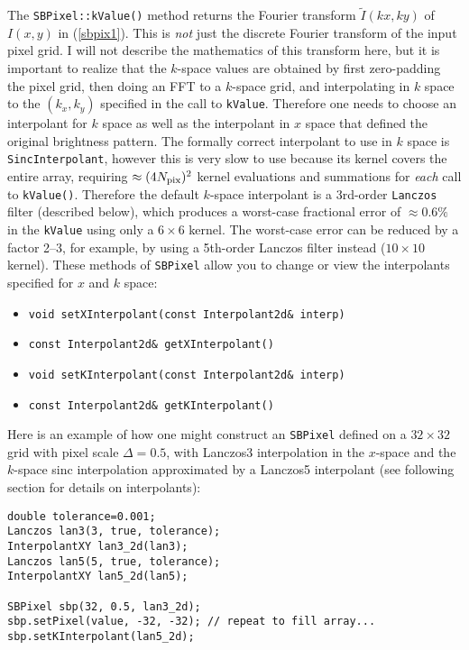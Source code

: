 \documentclass[11pt,preprint,flushrt]{aastex}
\begin{document}
The {\tt SBPixel::kValue()} method returns the Fourier transform $\tilde I(kx,ky)$ of $I(x,y)$ in (\ref{sbpix1}). This is {\em not} just the discrete Fourier transform of the input pixel grid.  I will not describe the mathematics of this transform here, but it is important to realize that the $k$-space values are obtained by first zero-padding the pixel grid, then doing an FFT to a $k$-space grid, and interpolating in $k$ space to the $(k_x, k_y)$ specified in the call to {\tt kValue}.  Therefore one needs to choose an interpolant for $k$ space as well as the interpolant in $x$ space that defined the original brightness pattern.  The formally correct interpolant to use in $k$ space is {\tt SincInterpolant}, however this is very slow to use because its kernel covers the entire array, requiring $\approx(4N_{\rm pix})^2$ kernel evaluations and summations for {\em each} call to {\tt kValue()}.  Therefore the default $k$-space interpolant is a 3rd-order {\tt Lanczos} filter (described below), which produces a worst-case fractional error of $\approx0.6\%$ in the {\tt kValue} using only a $6\times6$ kernel.  The worst-case error can be reduced by a factor 2--3, for example, by using a 5th-order Lanczos filter instead  ($10\times10$ kernel).  These methods of {\tt SBPixel} allow you to change or view the interpolants specified for $x$ and $k$ space:
\begin{itemize}
\item {\tt void setXInterpolant(const Interpolant2d\& interp)}
\item {\tt const Interpolant2d\&  getXInterpolant()}
\item {\tt void setKInterpolant(const Interpolant2d\& interp)}
\item {\tt const Interpolant2d\&  getKInterpolant()}
\end{itemize}
Here is an example of how one might construct an {\tt SBPixel} defined on a $32\times32$ grid with pixel scale $\Delta=0.5$, with Lanczos3 interpolation in the $x$-space and the $k$-space sinc interpolation approximated by a Lanczos5 interpolant (see following section for details on interpolants):
\begin{verbatim}
double tolerance=0.001;
Lanczos lan3(3, true, tolerance);
InterpolantXY lan3_2d(lan3);
Lanczos lan5(5, true, tolerance);
InterpolantXY lan5_2d(lan5);

SBPixel sbp(32, 0.5, lan3_2d);
sbp.setPixel(value, -32, -32); // repeat to fill array...
sbp.setKInterpolant(lan5_2d);
\end{verbatim}
\end{document}
